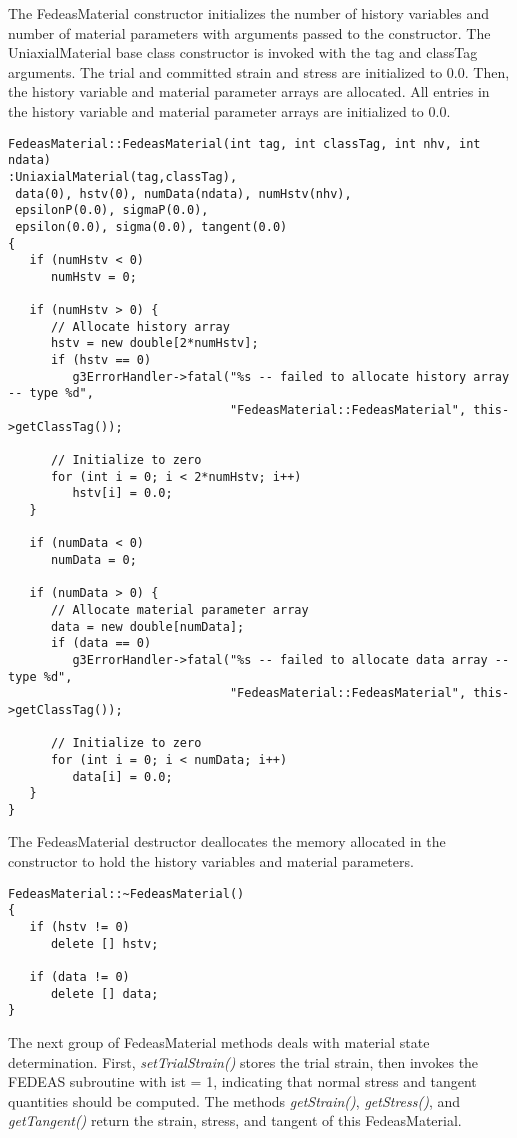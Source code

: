 \documentclass[12pt]{article}
\begin{document}
The FedeasMaterial constructor initializes the number of history variables and number
of material parameters with arguments passed to the constructor. The UniaxialMaterial
base class constructor is invoked with the tag and classTag arguments. The trial and
committed strain and stress are initialized to $0.0$. Then, the
history variable and material parameter arrays are allocated. All entries in the history
variable and material parameter arrays are initialized to $0.0$.

{\sf\small
\begin{verbatim}
FedeasMaterial::FedeasMaterial(int tag, int classTag, int nhv, int ndata)
:UniaxialMaterial(tag,classTag),
 data(0), hstv(0), numData(ndata), numHstv(nhv),
 epsilonP(0.0), sigmaP(0.0),
 epsilon(0.0), sigma(0.0), tangent(0.0)
{
   if (numHstv < 0)
      numHstv = 0;
     
   if (numHstv > 0) {
      // Allocate history array
      hstv = new double[2*numHstv];
      if (hstv == 0)
         g3ErrorHandler->fatal("%s -- failed to allocate history array -- type %d",
                               "FedeasMaterial::FedeasMaterial", this->getClassTag());

      // Initialize to zero
      for (int i = 0; i < 2*numHstv; i++)
         hstv[i] = 0.0;
   }
     
   if (numData < 0)
      numData = 0;
     
   if (numData > 0) {
      // Allocate material parameter array
      data = new double[numData];
      if (data == 0)
         g3ErrorHandler->fatal("%s -- failed to allocate data array -- type %d",
                               "FedeasMaterial::FedeasMaterial", this->getClassTag());

      // Initialize to zero
      for (int i = 0; i < numData; i++)
         data[i] = 0.0;
   }
}
\end{verbatim}
}

\noindent The FedeasMaterial destructor deallocates the memory allocated in the constructor
to hold the history variables and material parameters.

{\sf\small
\begin{verbatim}
FedeasMaterial::~FedeasMaterial()
{
   if (hstv != 0)
      delete [] hstv;
     
   if (data != 0)
      delete [] data;
}
\end{verbatim}
}

\noindent The next group of FedeasMaterial methods deals with material state determination.
First, {\em setTrialStrain()} stores the trial strain, then invokes the FEDEAS
subroutine with ist = 1, indicating that normal stress and tangent quantities should
be computed. The methods {\em getStrain()}, {\em getStress()}, and {\em getTangent()}
return the strain, stress, and tangent of this FedeasMaterial.
\end{document}
